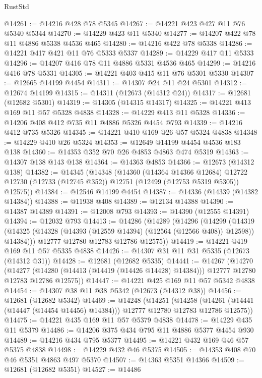 \begin{lexlean}{RustStd}
\begin{coremodule}
{\begin{coremodule}
{{{{{{{{{{{{{{{{{{{{{{{{{{{{{{{{{{{{{{{{{{{{{{{{{{{{{{{{{{{{{{{{{{{{{{{{{{{{{{{{@14261 := @14216 @428 @78 @5345
@14267 := @14221 @423 @427 @11 @76 @5340 @5344
@14270 := @14229 @423 @11 @5340
@14277 := @14207 @422 @78 @11 @4886 @5338 @4536 @465
@14280 := @14216 @422 @78 @5338
@14286 := @14221 @417 @421 @11 @76 @5333 @5337
@14289 := @14229 @417 @11 @5333
@14296 := @14207 @416 @78 @11 @4886 @5331 @4536 @465
@14299 := @14216 @416 @78 @5331
@14305 := @14221 @403 @415 @11 @76 @5301 @5330
@14307 := @12665 @14199 @4454
@14311 := @14307 @24 @11 @24 @5301
@14312 := @12674 @14199
@14315 := @14311 (@12673 (@14312 @24))
@14317 := @12681 (@12682 @5301)
@14319 := @14305 (@14315 @14317)
@14325 := @14221 @413 @169 @11 @57 @5328 @4838
@14328 := @14229 @413 @11 @5328
@14336 := @14206 @408 @412 @735 @11 @4886 @5326 @4454 @793
@14339 := @14216 @412 @735 @5326
@14345 := @14221 @410 @169 @26 @57 @5324 @4838
@14348 := @14229 @410 @26 @5324
@14353 := @12649 @14199 @4454 @4536 @183 @138
@14360 := @14353 @352 @70 @26 @4853 @4863 @474 @5319
@14363 := @14307 @138 @143 @138
@14364 := @14363 @4853
@14366 := @12673 (@14312 @138)
@14382 := @14345
    (@14348
      (@14360
        (@14364 @14366 @12684)
        @12722
        @12730
        (@12733 (@12745 @352))
        @12751
        (@12499 (@12753 @5319 @5305))
        @12575))
@14384 := @12546 @14199 @4454
@14387 := @14336 (@14339 (@14382 @14384))
@14388 := @11938 @408
@14389 := @12134 @14388
@14390 := @14387 @14389
@14391 := @12008 @793
@14393 := @14390 (@12555 @14391)
@14394 := @12032 @793
@14413 := @14286
    (@14289
      (@14296
        (@14299
          (@14319 (@14325 (@14328 (@14393 (@12559 @14394) (@12564 (@12566 @408)) @12598)) @14384)))
        @12777
        @12780
        @12783
        @12786
        @12575))
@14419 := @14221 @419 @169 @11 @57 @5335 @4838
@14426 := @14307 @31 @11 @31 @5335 (@12673 (@14312 @31))
@14428 := @12681 (@12682 @5335)
@14441 := @14267
    (@14270
      (@14277 (@14280 (@14413 (@14419 (@14426 @14428) @14384))) @12777 @12780 @12783 @12786 @12575))
@14447 := @14221 @425 @169 @11 @57 @5342 @4838
@14454 := @14307 @38 @11 @38 @5342 (@12673 (@14312 @38))
@14456 := @12681 (@12682 @5342)
@14469 := @14248
    (@14251
      (@14258 (@14261 (@14441 (@14447 (@14454 @14456) @14384))) @12777 @12780 @12783 @12786 @12575))
@14475 := @14221 @435 @169 @11 @57 @5379 @4838
@14478 := @14229 @435 @11 @5379
@14486 := @14206 @375 @434 @795 @11 @4886 @5377 @4454 @930
@14489 := @14216 @434 @795 @5377
@14495 := @14221 @432 @169 @46 @57 @5375 @4838
@14498 := @14229 @432 @46 @5375
@14505 := @14353 @408 @70 @46 @5351 @4863 @497 @5370
@14507 := @14363 @5351 @14366
@14509 := @12681 (@12682 @5351)
@14527 := @14486
}}}}}}}}}}}}}}}}}}}}}}}}}}}}}}}}}}}}}}}}}}}}}}}}}}}}}}}}}}}}}}}}}}}}}}}}}}}}}}}}
\end{coremodule}}
\end{coremodule}
\end{lexlean}
